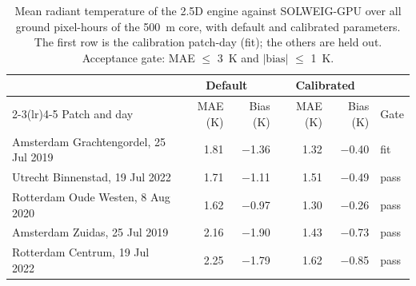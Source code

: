 \begin{table}[tbp]
\centering
\small
\setlength{\tabcolsep}{5pt}
\caption{Mean radiant temperature of the 2.5D engine against SOLWEIG-GPU over all ground pixel-hours of the 500~m core, with default and calibrated parameters. The first row is the calibration patch-day (fit); the others are held out. Acceptance gate: MAE $\le$ 3~K and $|\mathrm{bias}|$ $\le$ 1~K.}
\label{tab:T2_engine_vs_solweig}
\begin{tabular}{lrrrrl}
\toprule
 & \multicolumn{2}{c}{Default} & \multicolumn{2}{c}{Calibrated} & \\
\cmidrule(lr){2-3}\cmidrule(lr){4-5}
Patch and day & MAE (K) & Bias (K) & MAE (K) & Bias (K) & Gate \\
\midrule
Amsterdam Grachtengordel, 25 Jul 2019 & 1.81 & $-$1.36 & 1.32 & $-$0.40 & fit \\
Utrecht Binnenstad, 19 Jul 2022 & 1.71 & $-$1.11 & 1.51 & $-$0.49 & pass \\
Rotterdam Oude Westen, 8 Aug 2020 & 1.62 & $-$0.97 & 1.30 & $-$0.26 & pass \\
Amsterdam Zuidas, 25 Jul 2019 & 2.16 & $-$1.90 & 1.43 & $-$0.73 & pass \\
Rotterdam Centrum, 19 Jul 2022 & 2.25 & $-$1.79 & 1.62 & $-$0.85 & pass \\
\bottomrule
\end{tabular}
\end{table}
